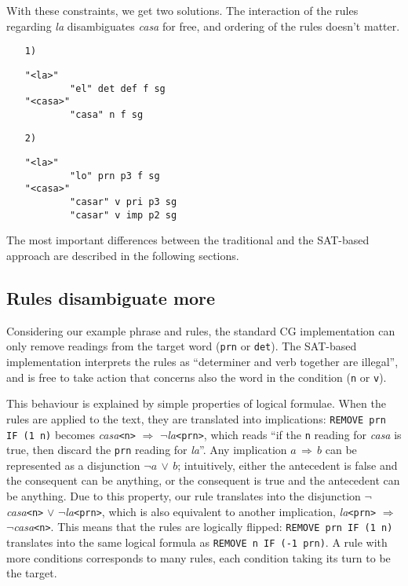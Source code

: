 \documentclass[11pt]{article}
\begin{document}
With these constraints, we get two solutions. The interaction of the rules regarding \emph{la}  disambiguates \emph{casa} for free, and ordering of the rules doesn't matter. 

\begin{enumerate}
\item [\texttt{1)}]
\begin{verbatim}
"<la>"
        "el" det def f sg
"<casa>"
        "casa" n f sg
\end{verbatim}
\item [\texttt{2)}]
\begin{verbatim}
"<la>"
        "lo" prn p3 f sg
"<casa>"
        "casar" v pri p3 sg
        "casar" v imp p2 sg
\end{verbatim}
\end{enumerate} 




\noindent The most important differences between the traditional and
the SAT-based approach are described in the following sections.

\subsection{Rules disambiguate more}
Considering our example phrase and rules, the standard CG implementation
can only remove readings from the target word (\texttt{prn} or
\texttt{det}). The SAT-based implementation interprets the rules as
``determiner and verb together are illegal'', and is free to take action that concerns also the word in the condition (\texttt{n} or \texttt{v}).

This behaviour is explained by simple properties of logical formulae.
When the rules are applied to the text, they are translated into
implications: \texttt{REMOVE prn IF (1 n)} becomes
 \emph{casa}\texttt{<n>} $\Rightarrow$ $\neg$\emph{la}\texttt{<prn>},
 which reads ``if the \texttt{n} reading for \emph{casa} is true, then
 discard the \texttt{prn} reading for \emph{la}''.
Any implication $a\,\Rightarrow\,b$ can be represented as a disjunction
$\neg a\,\vee\,b$; intuitively, either the antecedent is false
and the consequent can be anything, or the consequent is true and the
antecedent can be anything.
Due to this property, our rule translates into the disjunction 
$\neg$\emph{casa}\texttt{<n>} $\vee$ $\neg$\emph{la}\texttt{<prn>},
which is also equivalent to another implication, 
 \emph{la}\texttt{<prn>} $\Rightarrow$ $\neg$\emph{casa}\texttt{<n>}.
This means that the rules are logically flipped: \texttt{REMOVE prn IF
  (1 n)} translates into the same logical formula as  \texttt{REMOVE n
  IF (-1 prn)}. 
A rule with more conditions corresponds to many rules, each condition
taking its turn to be the target. %
\end{document}
